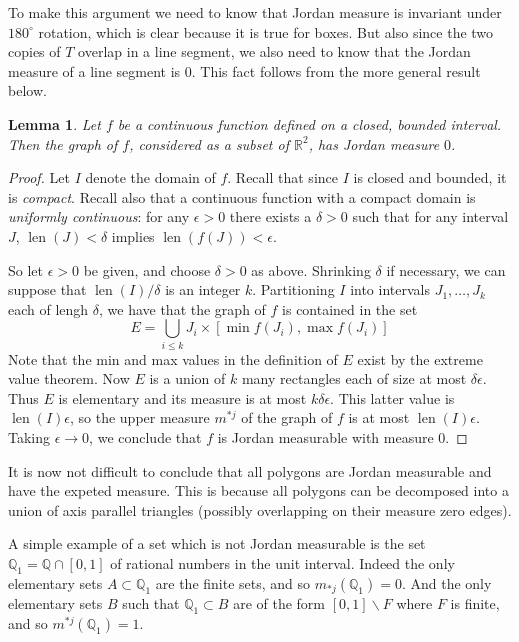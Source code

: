 \documentclass[11pt,oneside]{amsbook}
\renewcommand{\setminus}{\smallsetminus}
\newcommand{\QQ}{{\mathbb Q}}
\newcommand{\RR}{{\mathbb R}}
\DeclareMathOperator{\len}{len}
\theoremstyle{definition}
\theoremstyle{plain}
\newtheorem{lem}[thm]{Lemma}
\theoremstyle{definition}
\theoremstyle{remark}
\numberwithin{equation}{section}
\numberwithin{figure}{section}
\begin{document}
To make this argument we need to know that Jordan measure is invariant under $180^\circ$ rotation, which is clear because it is true for boxes. But also since the two copies of $T$ overlap in a line segment, we also need to know that the Jordan measure of a line segment is $0$. This fact follows from the more general result below.

\begin{lem}
  \label{lem:jordan-graph}
  Let $f$ be a continuous function defined on a closed, bounded interval. Then the graph of $f$, considered as a subset of $\RR^2$, has Jordan measure $0$.
\end{lem}

\begin{proof}
  Let $I$ denote the domain of $f$. Recall that since $I$ is closed and bounded, it is \emph{compact}. Recall also that a continuous function with a compact domain is \emph{uniformly continuous}: for any $\epsilon>0$ there exists a $\delta>0$ such that for any interval $J$, $\len(J)<\delta$ implies $\len(f(J))<\epsilon$.

  So let $\epsilon>0$ be given, and choose $\delta>0$ as above. Shrinking $\delta$ if necessary, we can suppose that $\len(I)/\delta$ is an integer $k$. Partitioning $I$ into intervals $J_1,\ldots,J_k$ each of lengh $\delta$, we have that the graph of $f$ is contained in the set
  \[E=\bigcup_{i\leq k} J_i\times[\min f(J_i),\max f(J_i)]
  \]
  Note that the min and max values in the definition of $E$ exist by the extreme value theorem. Now $E$ is a union of $k$ many rectangles each of size at most $\delta\epsilon$. Thus $E$ is elementary and its measure is at most $k\delta\epsilon$. This latter value is $\len(I)\epsilon$, so the upper measure $m^{*j}$ of the graph of $f$ is at most $\len(I)\epsilon$. Taking $\epsilon\to0$, we conclude that $f$ is Jordan measurable with measure $0$.
\end{proof}

It is now not difficult to conclude that all polygons are Jordan measurable and have the expeted measure. This is because all polygons can be decomposed into a union of axis parallel triangles (possibly overlapping on their measure zero edges).

A simple example of a set which is not Jordan measurable is the set $\QQ_1=\QQ\cap[0,1]$ of rational numbers in the unit interval. Indeed the only elementary sets $A\subset\QQ_1$ are the finite sets, and so $m_{*j}(\QQ_1)=0$. And the only elementary sets $B$ such that $\QQ_1\subset B$ are of the form $[0,1]\setminus F$ where $F$ is finite, and so $m^{*j}(\QQ_1)=1$.
\end{document}
